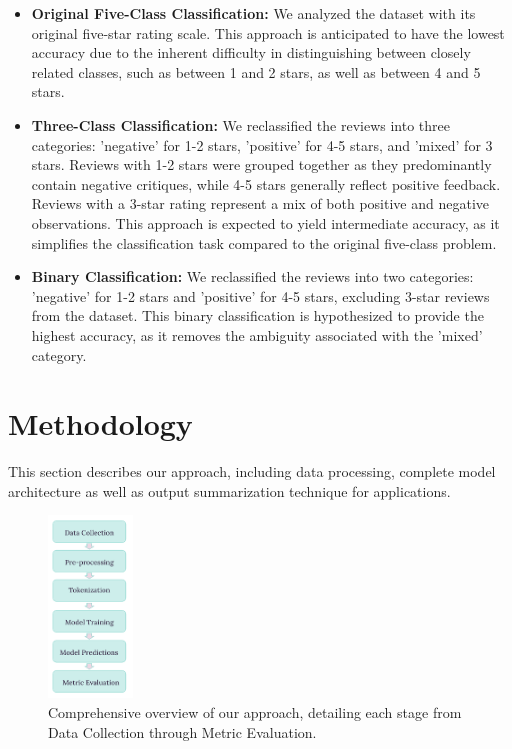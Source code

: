 \documentclass[12pt]{article}
\begin{document}
\begin{itemize}
  \item \textbf{Original Five-Class Classification:} We analyzed the dataset with its original five-star rating scale. This approach is anticipated to have the lowest accuracy due to the inherent difficulty in distinguishing between closely related classes, such as between 1 and 2 stars, as well as between 4 and 5 stars.

  \item \textbf{Three-Class Classification:} We reclassified the reviews into three categories: 'negative' for 1-2 stars, 'positive' for 4-5 stars, and 'mixed' for 3 stars. Reviews with 1-2 stars were grouped together as they predominantly contain negative critiques, while 4-5 stars generally reflect positive feedback. Reviews with a 3-star rating represent a mix of both positive and negative observations. This approach is expected to yield intermediate accuracy, as it simplifies the classification task compared to the original five-class problem.

  \item \textbf{Binary Classification:} We reclassified the reviews into two categories: 'negative' for 1-2 stars and 'positive' for 4-5 stars, excluding 3-star reviews from the dataset. This binary classification is hypothesized to provide the highest accuracy, as it removes the ambiguity associated with the 'mixed' category.
\end{itemize}

\section{Methodology}
This section describes our approach, including data processing, complete model architecture as well as output summarization technique for applications.

\begin{figure}[H]
  \centering
  \includegraphics[width=0.2\textwidth, height=0.3\textheight]{./methodology.jpg}
  \caption{Comprehensive overview of our approach, detailing each stage from Data Collection through Metric Evaluation.}
  \label{fig:methedology}
\end{figure}
\end{document}
